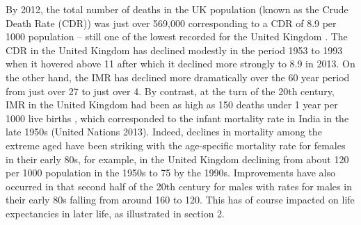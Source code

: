 \documentclass[11 pt, a4paper]{report}
\begin{document}
By 2012, the total number of deaths in the UK population (known as the Crude Death Rate (CDR)) was just over 569,000 corresponding to a CDR of 8.9 per 1000 population – still one of the lowest recorded for the United Kingdom \citep{ONS2014}. The CDR in the United Kingdom has declined modestly in the period 1953 to 1993 when it hovered above 11 after which it declined more strongly to 8.9 in 2013. On the other hand, the IMR has declined more dramatically over the 60 year period from just over 27 to just over 4.  By contrast, at the turn of the 20th century, IMR in the United Kingdom had been as high as 150 deaths under 1 year per 1000 live births \citep{ONS2014}, which corresponded to the infant mortality rate in India in the late 1950s (United Nations 2013). Indeed, declines in mortality among the extreme aged have been striking with the age-specific mortality rate for females in their early 80s, for example, in the United Kingdom declining from about 120 per 1000 population in the 1950s to 75 by the 1990s. Improvements have also occurred in that second half of the 20th century for males with rates for males in their early 80s falling from around 160 to 120. This has of course impacted on life expectancies in later life, as illustrated in section 2.
\end{document}
